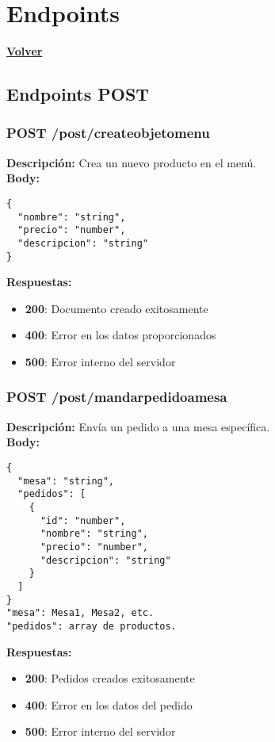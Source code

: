 \documentclass[12pt]{article}
\begin{document}
\clearpage

\section{Endpoints}
\hyperlink{anchor-indice}{\textbf{Volver}}\\

\subsection{Endpoints POST}

\subsubsection{POST /post/createobjetomenu}
\textbf{Descripción:} Crea un nuevo producto en el menú.\\

\textbf{Body:}
\begin{verbatim}
{
  "nombre": "string",
  "precio": "number",
  "descripcion": "string"
}
\end{verbatim}

\textbf{Respuestas:}
\begin{itemize}
    \item \textbf{200}: Documento creado exitosamente
    \item \textbf{400}: Error en los datos proporcionados
    \item \textbf{500}: Error interno del servidor
\end{itemize}

\subsubsection{POST /post/mandarpedidoamesa}
\textbf{Descripción:} Envía un pedido a una mesa específica.\\

\textbf{Body:}
\begin{verbatim}
{
  "mesa": "string",
  "pedidos": [
    {
      "id": "number",
      "nombre": "string",
      "precio": "number",
      "descripcion": "string"
    }
  ]
}
"mesa": Mesa1, Mesa2, etc.
"pedidos": array de productos.
\end{verbatim}

\textbf{Respuestas:}
\begin{itemize}
    \item \textbf{200}: Pedidos creados exitosamente
    \item \textbf{400}: Error en los datos del pedido
    \item \textbf{500}: Error interno del servidor
\end{itemize}
\end{document}
